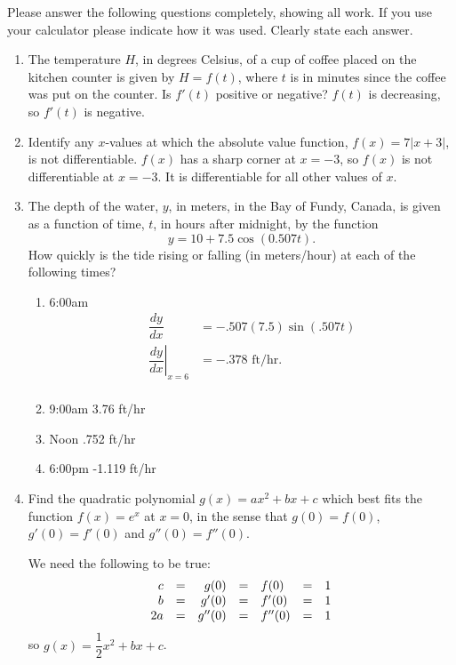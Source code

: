 \documentclass[11pt]{article}
\begin{document}
\drawtitle

\noindent Please answer the following questions completely, showing all work.
If you use your calculator please indicate how it was used.  Clearly
state each answer.

\begin{enumerate}
\item The temperature $H$, in degrees Celsius, of a cup of coffee
  placed on the kitchen counter is given by $H=f(t)$, where $t$ is in
  minutes since the coffee was put on the counter.  Is $f'(t)$
  positive or negative?
\vfill
$f(t)$ is decreasing, so $f'(t)$ is negative.
\vfill

\item Identify any $x$-values at which the absolute value function,
  $f(x)=7|x+3|$, is not differentiable.
\vfill
$f(x)$ has a sharp corner at $x=-3$, so $f(x)$ is not differentiable
at $x=-3$.  It is differentiable for all other values of $x$.
\vfill
\newpage

\item The depth of the water, $y$, in meters, in the Bay of Fundy,
  Canada, is given as a function of time, $t$, in hours after
  midnight, by the function
  \[
  y=10+7.5\cos(0.507t).
  \]
  How quickly is the tide rising or falling (in meters/hour) at each
  of the following times?
  \begin{enumerate}
  \item 6:00am
    \vfill
    \begin{align*}
      \dfrac{dy}{dx} &=-.507(7.5)\sin(.507t)\\
      \left.\dfrac{dy}{dx}\right|_{x=6} &=-.378\mbox{ ft/hr}.\\
    \end{align*}
    \vfill
  \item 9:00am
    \vfill
    3.76 ft/hr
    \vfill
  \item Noon
    \vfill
    .752 ft/hr
    \vfill
  \item 6:00pm
    \vfill
    -1.119 ft/hr
    \vfill
  \end{enumerate}

\newpage

\item Find the quadratic polynomial $g(x)=ax^2+bx+c$ which best fits
  the function $f(x)=e^x$ at $x=0$, in the sense that $g(0)=f(0)$,
  $g'(0)=f'(0)$ and $g''(0)=f''(0)$.

\vfill
We need the following to be true:
\[
\begin{array}{{rcrclcl}}
  c&=&g(0)&=&f(0)&=& 1\\
  b&=&g'(0)&=&f'(0)&=& 1\\
  2a&=&g''(0)&=&f''(0)&=& 1\\
\end{array}
\]
so $g(x)=\dfrac{1}{2}x^2+bx+c$.
\vfill
\newpage


\end{enumerate}
\end{document}
